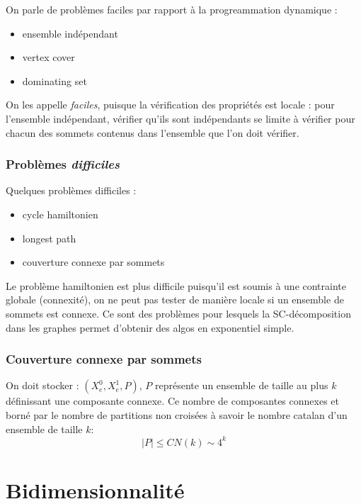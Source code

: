 \documentclass[a4paper, 11pt]{thesis}
\begin{document}
On parle de problèmes faciles par rapport à la progreammation dynamique : 
\begin{itemize}
    \item ensemble indépendant
    \item vertex cover
    \item dominating set
\end{itemize}

On les appelle \emph{faciles}, puisque la vérification des propriétés est locale :
pour l'ensemble indépendant, vérifier qu'ils sont indépendants se limite à vérifier pour chacun des
sommets contenus dans l'ensemble que l'on doit vérifier.

\subsubsection{Problèmes \emph{difficiles}}

Quelques problèmes difficiles :
\begin{itemize}
    \item cycle hamiltonien
    \item longest path
    \item couverture connexe par sommets
\end{itemize}

Le problème hamiltonien est plus difficile puisqu'il est soumis à une contrainte globale
(connexité), on ne peut pas tester de manière locale si un ensemble de sommets est connexe. Ce sont
des problèmes pour lesquels la SC-décomposition dans les graphes permet d'obtenir des algos en
exponentiel simple.

\subsubsection{Couverture connexe par sommets}

On doit stocker : $(X_e^0, X_e^1, P)$, $P$ représente un ensemble de taille au plus $k$ définissant
une composante connexe. Ce nombre de composantes connexes et borné par le nombre de partitions non
croisées à savoir le nombre catalan d'un ensemble de taille $k$:\begin{displaymath}
    |P| \leq CN(k) \sim 4^k
\end{displaymath}

\section{Bidimensionnalité}
\end{document}
